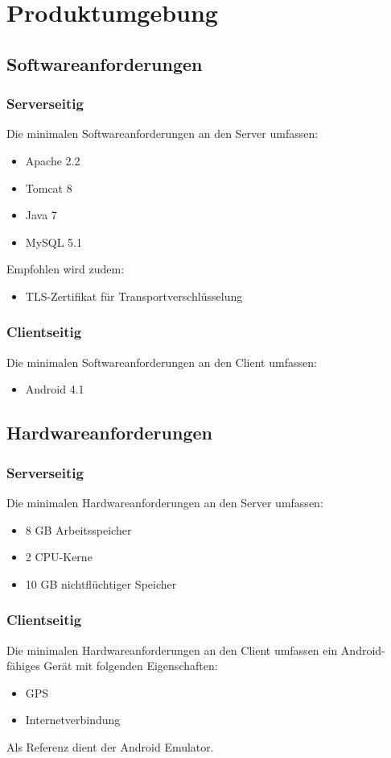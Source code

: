 \section{Produktumgebung}
\subsection{Softwareanforderungen}

\subsubsection{Serverseitig}
Die minimalen Softwareanforderungen an den Server umfassen:
\begin{itemize}
\item Apache 2.2
\item Tomcat 8
\item Java 7
\item MySQL 5.1

\end{itemize}

Empfohlen wird zudem:
\begin{itemize}
\item TLS-Zertifikat für Transportverschlüsselung
\end{itemize}

\subsubsection{Clientseitig}
Die minimalen Softwareanforderungen an den Client umfassen:
\begin{itemize}
\item Android 4.1

\end{itemize}


\subsection{Hardwareanforderungen}
\subsubsection{Serverseitig}
Die minimalen Hardwareanforderungen an den Server umfassen:
\begin{itemize}
\item 8 GB Arbeitsspeicher
\item 2 CPU-Kerne
\item 10 GB nichtflüchtiger Speicher
\end{itemize}

\subsubsection{Clientseitig}
Die minimalen Hardwareanforderungen an den Client umfassen ein Android-fähiges Gerät mit folgenden Eigenschaften:
\begin{itemize}
\item GPS
\item Internetverbindung
\end{itemize}

Als Referenz dient der Android Emulator.

